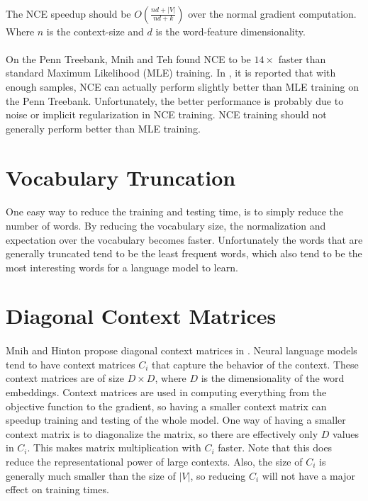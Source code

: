 \paragraph{}
The NCE speedup should be $O(\frac{nd + |V|} {nd+ k})$ over the normal gradient computation. Where $n$ is the context-size and $d$ is the word-feature dimensionality.
\paragraph{}
On the Penn Treebank, Mnih and Teh found NCE to be $14\times$ faster than standard Maximum Likelihood (MLE)  training. In \cite{MnihTeh2012}, it is reported that with enough samples, NCE can actually perform slightly better than MLE training on the Penn Treebank. Unfortunately, the better performance is probably due to noise or implicit regularization in NCE training. NCE training should not generally perform better than MLE training.


\section{Vocabulary Truncation}
\paragraph{}
One easy way to reduce the training and testing time, is to simply reduce the number of words. By reducing the vocabulary size, the normalization and expectation over the vocabulary becomes faster. Unfortunately the words that are generally truncated tend to be the least frequent words, which also tend to be the most interesting words for a language model to learn.

\section{Diagonal Context Matrices}
\paragraph{}
Mnih and Hinton propose diagonal context matrices in \cite{MnihHinton2009}. Neural language models tend to have context matrices $C_i$ that capture the behavior of the context. These context matrices are of size $D \times D$, where $D$ is the dimensionality of the word embeddings. Context matrices are used in computing everything from the objective function to the gradient, so having a smaller context matrix can speedup training and testing of the whole model. One way of having a smaller context matrix is to diagonalize the matrix, so there are effectively only $D$ values in $C_i$. This makes matrix multiplication with $C_i$ faster. Note that this does reduce the representational power of large contexts. Also, the size of $C_i$ is generally much smaller than the size of $|V|$, so reducing $C_i$ will not have a major effect on training times.

